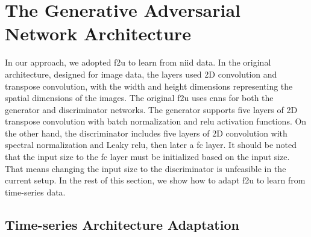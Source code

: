 \section{The Generative Adversarial Network Architecture}

In our approach, we adopted \gls*{f2u} to learn from \gls*{niid} data. In the original architecture, designed for image data, the layers used 2D convolution and transpose convolution, with the width and height dimensions representing the spatial dimensions of the images. 
%
The original \gls*{f2u} uses \glspl*{cnn} for both the generator and discriminator networks. The generator supports five layers of 2D transpose convolution with batch normalization and \gls*{relu} activation functions. On the other hand, the discriminator includes five layers of 2D convolution with spectral normalization \cite{miyato_spectral_2018} and Leaky \gls*{relu}, then later a \gls*{fc} layer. It should be noted that the input size to the \gls*{fc} layer must be initialized based on the input size. That means changing the input size to the discriminator is unfeasible in the current setup.
In the rest of this section, we show how to adapt \gls*{f2u} to learn from time-series data.


\subsection{Time-series Architecture Adaptation}

